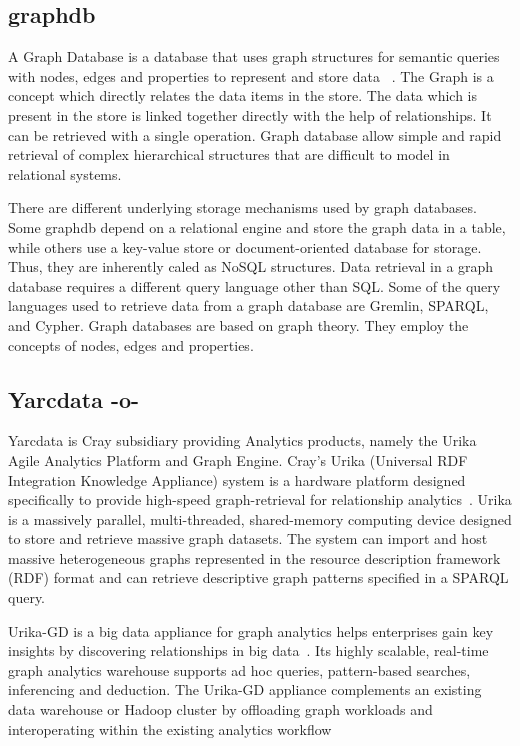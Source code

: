      \pv

     
\subsection{graphdb}

A Graph Database is a database that uses graph structures for semantic
queries with nodes, edges and properties to represent and store data
~\cite{www-graphdb}. The Graph is a concept which directly relates the
data items in the store.  The data which is present in the store is
linked together directly with the help of relationships. It can be
retrieved with a single operation.  Graph database allow simple and
rapid retrieval of complex hierarchical structures that are difficult
to model in relational systems.

     There are different underlying storage mechanisms used by graph
     databases.  Some graphdb depend on a relational engine and store
     the graph data in a table, while others use a key-value store or
     document-oriented database for storage. Thus, they are inherently
     caled as NoSQL structures.  Data retrieval in a graph database
     requires a different query language other than SQL. Some of the
     query languages used to retrieve data from a graph database are
     Gremlin, SPARQL, and Cypher.  Graph databases are based on graph
     theory. They employ the concepts of nodes, edges and properties.

     \pv
     
\subsection{Yarcdata -o-}

Yarcdata is Cray subsidiary providing Analytics products, namely the
Urika Agile Analytics Platform and Graph Engine. Cray's Urika
(Universal RDF Integration Knowledge Appliance) system is a hardware
platform designed specifically to provide high-speed graph-retrieval
for relationship analytics~\cite{www-Urika-appliance}.  Urika is a
massively parallel, multi-threaded, shared-memory computing device
designed to store and retrieve massive graph datasets. The system can
import and host massive heterogeneous graphs represented in the
resource description framework (RDF) format and can retrieve
descriptive graph patterns specified in a SPARQL query.

Urika-GD is a big data appliance for graph analytics helps enterprises
gain key insights by discovering relationships in big
data~\cite{techspec-Urika-GD}.  Its highly scalable, real-time graph
analytics warehouse supports ad hoc queries, pattern-based searches,
inferencing and deduction. The Urika-GD appliance complements an
existing data warehouse or Hadoop cluster by offloading graph
workloads and interoperating within the existing analytics workflow

